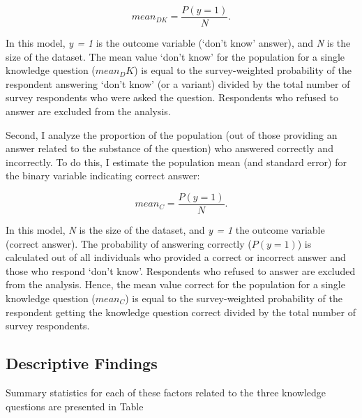 \documentclass[11pt]{article}
\begin{document}
 $$ mean_{DK} = \frac{P(y = 1)}{N}. $$

In this model, \emph{y = 1} is the outcome variable (`don't know' answer), and
\emph{N} is the size of the dataset. The mean value `don't know' for the population for a single knowledge
question ($mean_DK$) is equal to the survey-weighted probability of the
respondent answering `don't know' (or a variant) divided by the total number of
survey respondents who were asked the question. Respondents who refused to answer are excluded from the analysis.

Second, I analyze the proportion of the population (out of those providing an answer related to the substance of the
question) who answered correctly and incorrectly. To do this, I estimate the
population mean (and standard error) for the binary variable indicating correct
answer:

 $$ mean_C = \frac{P(y = 1)}{N}. $$

In this model, \emph{N} is the size of the dataset, and \emph{y = 1} the outcome
variable (correct answer). The probability of answering correctly ($P(y = 1)$)
is calculated out of all individuals who provided a correct or incorrect answer and those who respond
`don't know'. Respondents who refused to answer are excluded from the analysis.
Hence, the mean value correct for the population for a single knowledge
question ($mean_C$) is equal to the survey-weighted probability of the
respondent getting the knowledge question correct divided by the total number of
survey respondents.



\subsection{Descriptive Findings}\label{sec:descriptives}

Summary statistics for each of these factors related to the three knowledge questions are presented in Table%

\end{document}
